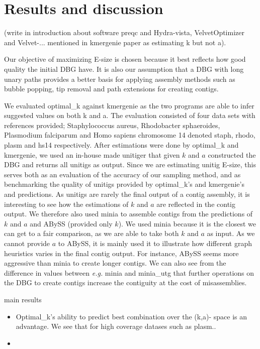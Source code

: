 \documentclass{article}
\begin{document}
\section{Results and discussion}
\label{sec:Results and discussion}
(write in introduction about software preqc and Hydra-vista, VelvetOptimizer and Velvet-... mentioned in kmergenie paper as estimating k but not a).

Our objective of maximizing E-size is chosen because it best reflects how good quality the initial DBG have. It is also our assumption that a DBG with long unary paths provides a better basis for applying assembly methods such as bubble popping, tip removal and path extensions for creating contigs.

We evaluated optimal\_k against kmergenie as the two programs are able to infer suggested values on both k and a.  The evaluation consisted of four data sets with references provided; Staphylococcus aureus, Rhodobacter sphaeroides, Plasmodium falciparum and Homo sapiens chromosome 14 denoted staph, rhodo, plasm and hs14 respectively. After estimations were done by optimal\_k and kmergenie, we used an in-house made unitiger that given $k$ and $a$ constructed the DBG and returns all unitigs as output. Since we are estimating unitig E-size, this serves both as an evaluation of the accuracy of our sampling method, and as benchmarking the quality of unitigs provided by optimal\_k's and kmergenie's and predictions. As unitigs are rarely the final output of a contig assembly, it is interesting to see how the estimations of $k$ and $a$ are reflected in the contig output. We therefore also used minia to assemble contigs from the predictions of $k$ and $a$ and ABySS (provided only $k$). We used minia because it is the closest we can get to a fair comparison, as we are able to take both $k$ and $a$ as input. As we cannot provide $a$ to ABySS, it is mainly used it to illustrate how different graph heuristics varies in the final contig output. For instance, ABySS seems more aggressive than minia to create longer contigs. We can also see from the difference in values between \emph{e.g.} minia and minia\_utg that further operations on the DBG to create contigs increase the contiguity at the cost of misassemblies. 




main results
\begin{itemize}
	\item Optimal\_k's ability to predict best combination over the (k,a)- space is an advantage. We see that for high coverage datases such as plasm..
	\item 
\end{itemize}
\end{document}
